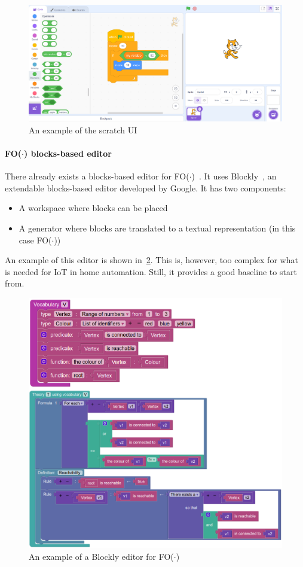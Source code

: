 \documentclass[11pt,a4paper]{report}
\newcommand{\fodot}{FO($\cdot$)\xspace}
\begin{document}
\begin{figure}
    \centering
    \includegraphics[width=1\linewidth]{images/block-based_scratch.png}
    \caption{An example of the scratch UI}
    \label{fig:scratch}
\end{figure}

\paragraph{\fodot blocks-based editor}
There already exists a blocks-based editor for \fodot~\cite{IDPStructuredBlockbasedEditor}. It uses Blockly~\cite{Blockly}, an extendable blocks-based editor developed by Google. It has two components:
\begin{itemize}
	\item A workspace where blocks can be placed
	\item A generator where blocks are translated to a textual representation (in this case \fodot)
\end{itemize}
An example of this editor is shown in~\ref{fig:blockly_IDP_example}. This is, however, too complex for what is needed for IoT in home automation. Still, it provides a good baseline to start from.

\begin{figure}
    \centering
    \includegraphics[width=0.8\linewidth]{images/blockly_IDP_example.png}
    \caption{An example of a Blockly editor for \fodot}
    \label{fig:blockly_IDP_example}
\end{figure}
\end{document}
